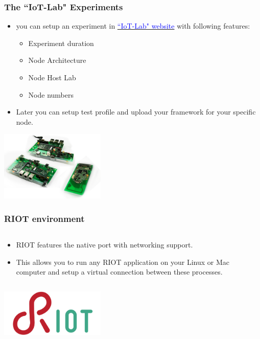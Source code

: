 \documentclass{beamer}
\begin{document}
\begin{frame}
	\frametitle{The ``IoT-Lab" Experiments}
	\vspace{.1cm}
	\begin{itemize}
		\item you can setup an experiment in
		\href{http://iot-lab.info}{\textcolor{blue}{``IoT-Lab" website}} with following
		features:
		\begin{itemize}
			\item Experiment duration
			\item Node Architecture
			\item Node Host Lab
			\item Node numbers
		\end{itemize}
		\item Later you can setup test profile and upload your framework for your specific node.
	\end{itemize}
	\vspace{.5cm}
	\hspace*{5.5cm} \includegraphics[width=5cm]{figs/iot-lab-3.png}
\end{frame}

\begin{frame}
	\frametitle{RIOT environment}
	\begin{columns}[c]
		\begin{column}{30cm}
			\vspace{.1cm}
			\begin{itemize}
				\justifying
				\item RIOT features the native port with networking support.
				\item This allows you to run any RIOT application on your Linux or Mac\\
				computer and setup a virtual connection between these processes.
			\end{itemize}
		\end{column}
	\end{columns}
	\vspace{.5cm}
	\hspace*{5.5cm} \includegraphics[width=5cm]{figs/riot-logo.png}
\end{frame}
\end{document}
